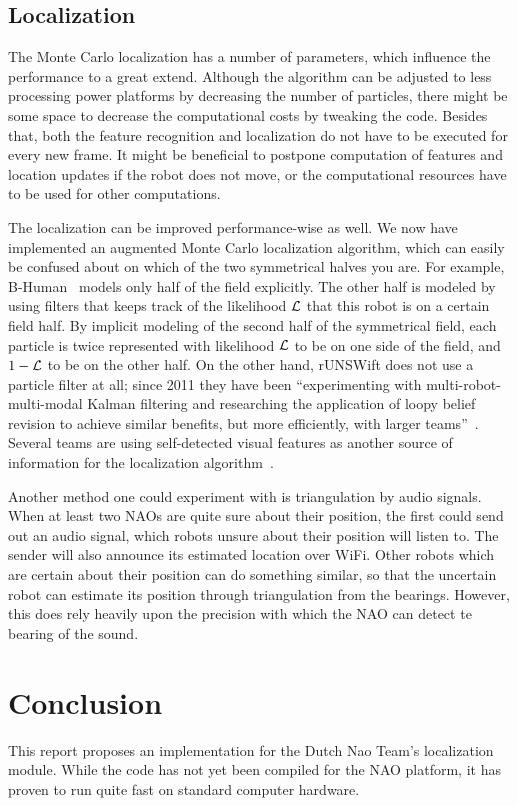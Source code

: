 \documentclass[	DIV=calc,%
							paper=a4,%
							fontsize=9pt,%
							twocolumn]{scrartcl}	 					%
\begin{document}
\subsection{Localization}
The Monte Carlo localization has a number of parameters, which influence the performance to a great extend.
Although the algorithm can be adjusted to less processing power platforms by decreasing the number of particles, there might be some space to decrease the computational costs by tweaking the code.
Besides that, both the feature recognition and localization do not have to be executed for every new frame. It might be beneficial to postpone computation of features and location updates if the robot does not move, or the computational resources have to be used for other computations.

The localization can be improved performance-wise as well.  We now have implemented an augmented Monte Carlo localization algorithm, which can easily be confused about on which of the two symmetrical halves you are.  For example, B-Human~\cite{TeamReportB-Human} models only half of the field explicitly.  The other half is modeled by using filters that keeps track of the likelihood ${\cal L}$ that this robot is on a certain field half.  By implicit modeling of the second half of the symmetrical field, each particle is twice represented with likelihood ${\cal L}$ to be on one side of the field, and $1 - {\cal L}$ to be on the other half.  On the other hand, rUNSWift does not use a particle filter at all; since 2011 they have been ``experimenting with multi-robot-multi-modal Kalman filtering and researching the application of loopy belief revision to achieve similar benefits, but more efficiently, with larger teams''~\cite{rUNSWift-TD-11}.  Several teams are using self-detected visual features as another source of information for the localization algorithm~\cite{sturm2006msc,Cuauhpipiltin-TD12}.

Another method one could experiment with is triangulation by audio signals.  When at least two NAOs are quite sure about their position, the first could send out an audio signal, which robots unsure about their position will listen to.  The sender will also announce its estimated location over WiFi. Other robots which are certain about their position can do something similar, so that the uncertain robot can estimate its position through triangulation from the bearings.  However, this does rely heavily upon the precision with which the NAO can detect te bearing of the sound.


\section{Conclusion}
\label{sec:Conclusion}
This report proposes an implementation for the Dutch Nao Team's localization module. While the code has not yet been compiled for the NAO platform, it has proven to run quite fast on standard computer hardware. 
\end{document}
